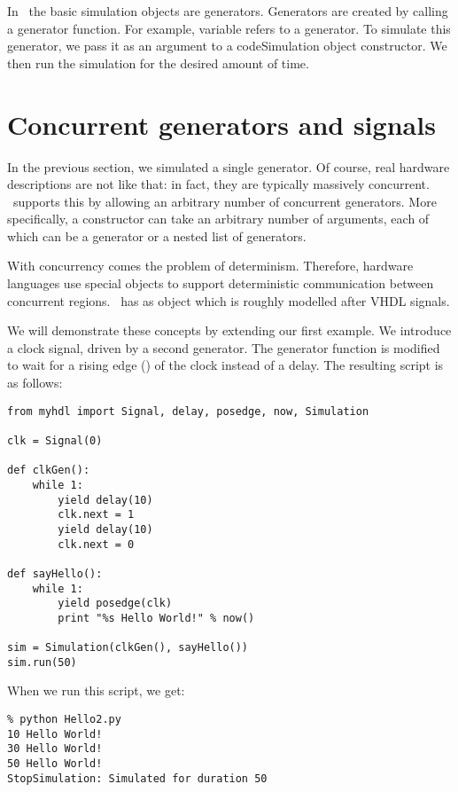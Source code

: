 In \myhdl\, the basic simulation objects are generators. Generators
are created by calling a generator function. For example, variable
 refers to a generator. To simulate this generator, we pass
it as an argument to a code{Simulation} object constructor.  We then
run the simulation for the desired amount of time.


\section{Concurrent generators and signals}

In the previous section, we simulated a single generator. Of course,
real hardware descriptions are not like that: in fact, they are
typically massively concurrent. \myhdl\ supports this by allowing an
arbitrary number of concurrent generators. More specifically, a
 constructor can take an arbitrary number of
arguments, each of which can be a generator or a nested list of
generators.

With concurrency comes the problem of determinism. Therefore, hardware
languages use special objects to support deterministic communication
between concurrent regions. \myhdl\ has as  object which
is roughly modelled after VHDL signals.

We will demonstrate these concepts by extending our first example. We
introduce a clock signal, driven by a second generator. The
 generator function is modified to wait for a rising
edge () of the clock instead of a delay. The resulting
script is as follows:

\begin{verbatim}
from myhdl import Signal, delay, posedge, now, Simulation

clk = Signal(0)

def clkGen():
    while 1:
        yield delay(10)
        clk.next = 1
        yield delay(10)
        clk.next = 0

def sayHello():
    while 1:
        yield posedge(clk)
        print "%s Hello World!" % now()

sim = Simulation(clkGen(), sayHello())
sim.run(50)

\end{verbatim}

When we run this script, we get:

\begin{verbatim}
% python Hello2.py
10 Hello World!
30 Hello World!
50 Hello World!
StopSimulation: Simulated for duration 50

\end{verbatim}

